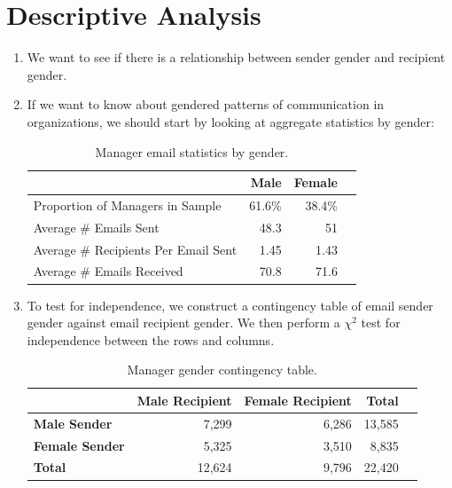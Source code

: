 \documentclass[fleqn]{MJDArticle}
\begin{document}
\section{Descriptive Analysis}
\begin{enumerate}
	
	\item We want to see if there is a relationship between sender gender and recipient gender.
	\item If we want to know about gendered patterns of communication in organizations, we should start by looking at aggregate statistics by gender:
	
	
	\begin{table}[H]
	\centering
		\begin{tabular}{m{2in}rrr}
		\toprule
	& \textbf{Male} & \textbf{Female}  \\
		 \midrule
		 Proportion of Managers in Sample & 61.6\%& 38.4\% \\
		 \midrule
		 Average \# Emails Sent & 48.3 & 51 \\
		 Average \# Recipients Per Email Sent & 1.45 & 1.43 \\
		 \midrule
		 Average \# Emails Received & 70.8 & 71.6 \\
		\bottomrule
		\end{tabular}
		\caption{\label{tab:email agg stats}Manager email statistics by gender.}
	\end{table}
	
	
	\item To test for independence, we construct a contingency table of email sender gender against email recipient gender. We then perform a $\chi^2$ test for independence between the rows and columns.
	
	\begin{table}[H]
	\centering
		\begin{tabular}{lrrrr}
		\toprule
	& \textbf{Male Recipient} & \textbf{Female Recipient} & \textbf{Total}  \\
		 \midrule
		 \textbf{Male Sender} & 7,299 & 6,286 & 13,585 \\
		 \textbf{Female Sender} & 5,325 & 3,510 & 8,835 \\
		 \textbf{Total} & 12,624 & 9,796 & 22,420\\
		\bottomrule
		\end{tabular}
		\caption{\label{tab:email agg stats}Manager gender contingency table.}
	\end{table}
	

\end{enumerate}
\end{document}
